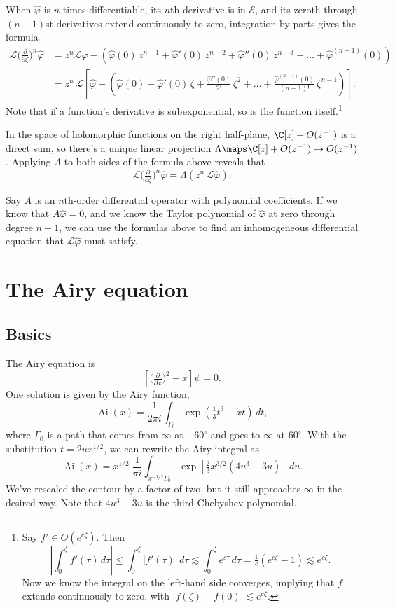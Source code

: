 \documentclass{article}
\theoremstyle{definition}
\theoremstyle{plain}
\newcommand{\laplace}{\mathcal{L}}
\DeclareMathOperator{\Ai}{Ai}
\begin{document}
When $\hat{\varphi}$ is $n$ times differentiable, its $n$th derivative is in $\mathcal{E}$, and its zeroth through $(n - 1)$st derivatives extend continuously to zero, integration by parts gives the formula
\begin{align*}
\laplace \big(\tfrac{\partial}{\partial \zeta}\big)^n \hat{\varphi} & = z^n \laplace \hat{\varphi} - \left( \hat{\varphi}(0)\,z^{n-1} + \hat{\varphi}'(0)\,z^{n-2} + \hat{\varphi}''(0)\,z^{n-3} + \ldots + \hat{\varphi}^{(n-1)}(0) \right) \\
& = z^n\,\laplace\left[ \hat{\varphi} - \left( \hat{\varphi}(0) + \hat{\varphi}'(0)\,\zeta + \tfrac{\hat{\varphi}''(0)}{2!}\,\zeta^2 + \ldots + \tfrac{\hat{\varphi}^{(n-1)}(0)}{(n-1)!}\,\zeta^{n-1} \right) \right].
\end{align*}
Note that if a function's derivative is subexponential, so is the function itself.\footnote{Say $f' \in O(e^{c\zeta})$. Then \[ \left|\int_0^\zeta f'(\tau)\,d\tau\right| \le \int_0^\zeta |f'(\tau)|\,d\tau \lesssim \int_0^\zeta e^{c\tau}\,d\tau = \tfrac{1}{c}(e^{c\zeta} - 1) \lesssim e^{c\zeta}.\] Now we know the integral on the left-hand side converges, implying that $f$ extends continuously to zero, with $|f(\zeta) - f(0)| \lesssim e^{c\zeta}$.}

In the space of holomorphic functions on the right half-plane, $\C[z] + O(z^{-1})$ is a direct sum, so there's a unique linear projection $\Lambda \maps \C[z] + O(z^{-1}) \to O(z^{-1})$. Applying $\Lambda$ to both sides of the formula above reveals that
\[ \laplace \big(\tfrac{\partial}{\partial \zeta}\big)^n \hat{\varphi} = \Lambda (z^n\,\laplace \hat{\varphi}). \]

Say $A$ is an $n$th-order differential operator with polynomial coefficients. If we know that $A\hat{\varphi} = 0$, and we know the Taylor polynomial of $\hat{\varphi}$ at zero through degree $n - 1$, we can use the formulas above to find an inhomogeneous differential equation that $\laplace \hat{\varphi}$ must satisfy.
\section{The Airy equation}
\subsection{Basics}
The Airy equation is
\begin{equation}\label{eqn:airy}
\left[\big(\tfrac{\partial}{\partial x}\big)^2 - x\right] \psi = 0.
\end{equation}
One solution is given by the Airy function,
\[ \Ai(x) = \frac{1}{2\pi i} \int_{\Gamma_0} \exp\left(\tfrac{1}{3}t^3 - xt\right)\,dt, \]
where $\Gamma_0$ is a path that comes from $\infty$ at $-60^\circ$ and goes to $\infty$ at $60^\circ$. With the substitution $t = 2ux^{1/2}$, we can rewrite the Airy integral as
\[ \Ai(x) = x^{1/2}\;\frac{1}{\pi i} \int_{x^{-1/2} \Gamma_0} \exp\left[\tfrac{2}{3}x^{3/2} \left(4u^3 - 3u\right)\right]\,du. \]
We've rescaled the contour by a factor of two, but it still approaches $\infty$ in the desired way. Note that $4u^3 - 3u$ is the third Chebyshev polynomial.
\end{document}
